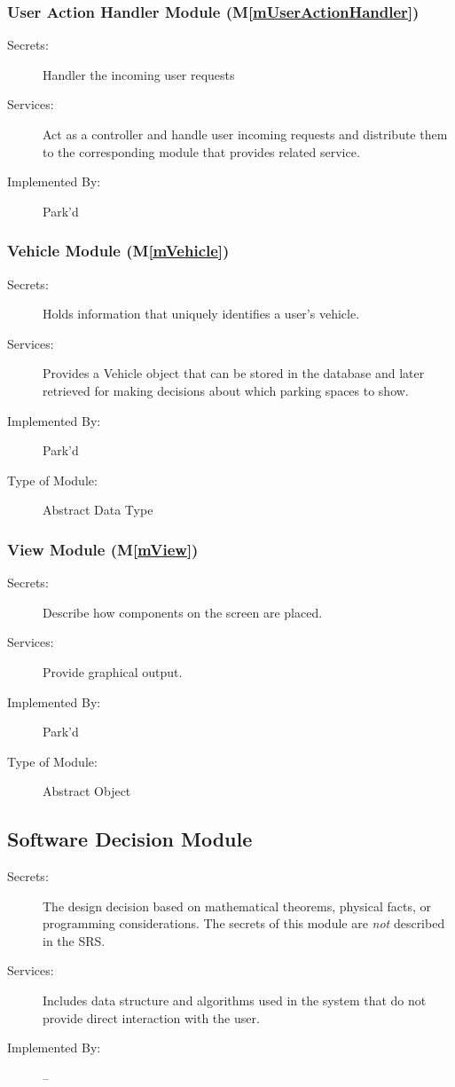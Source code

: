 \documentclass[12pt, titlepage]{article}
\newcommand{\mref}[1]{M\ref{#1}}
\begin{document}
\subsubsection{User Action Handler Module (\mref{mUserActionHandler})}
\begin{description}
\item[Secrets:] Handler the incoming user requests
\item[Services:] Act as a controller and handle user incoming requests and
distribute them to the corresponding module that provides related service.
\item[Implemented By:] Park'd
\end{description}

\subsubsection{Vehicle Module (\mref{mVehicle})}
\begin{description}
\item[Secrets:] Holds information that uniquely identifies a user's vehicle.
\item[Services:] Provides a Vehicle object that can be stored in the database
and later retrieved for making decisions about which parking spaces to show.
\item[Implemented By:] Park'd
\item[Type of Module:] Abstract Data Type
\end{description}

\subsubsection{View Module (\mref{mView})}
\begin{description}
\item[Secrets:] Describe how components on the screen are placed.
\item[Services:] Provide graphical output.
\item[Implemented By:] Park'd
\item[Type of Module:] Abstract Object
\end{description}

\subsection{Software Decision Module}

\begin{description}
\item[Secrets:] The design decision based on mathematical theorems, physical
  facts, or programming considerations. The secrets of this module are
  \emph{not} described in the SRS.
\item[Services:] Includes data structure and algorithms used in the system that
  do not provide direct interaction with the user. 
\item[Implemented By:] --
\end{description}
\end{document}
